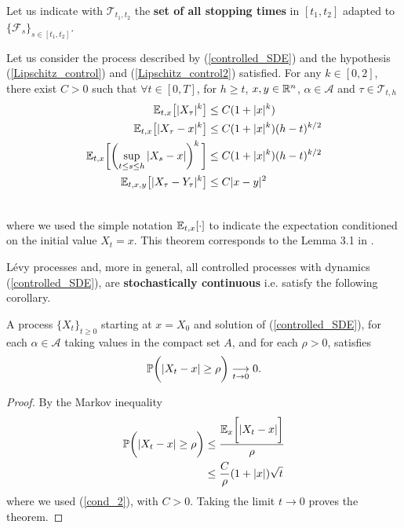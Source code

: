 \begin{Definition}
 Let us indicate with $\mathcal{T}_{t_1,t_2}$ the \textbf{set of all stopping times} in $[t_1,t_2]$ adapted to $\{\mathcal{F}_s\}_{s\in [t_1,t_2]}$.
\end{Definition}
\begin{Theorem}
 Let us consider the process described by (\ref{controlled_SDE}) and the hypothesis (\ref{Lipschitz_control}) and (\ref{Lipschitz_control2}) satisfied. 
 For any $k \in [0,2]$, there exist $C>0$ such that $\forall t \in [0,T]$, for $h \geq t$, $x,y \in \mathbb{R}^n$, 
 $\alpha \in \mathcal{A}$ and $\tau \in \mathcal{T}_{t,h}$
 \begin{align}
  \mathbb{E}_{t,x}\bigl[ |X_{\tau}|^k \bigr] &\leq C (1+|x|^k) \\ \label{cond_2}
  \mathbb{E}_{t,x}\bigl[ |X_{\tau} - x|^k \bigr] &\leq C (1+|x|^k)(h-t)^{k/2} \\ \label{cond_3}
  \mathbb{E}_{t,x}\biggl[ \biggl( \sup_{t \leq s\leq h} |X_{s} - x| \biggr)^k \, \biggr] &\leq C (1+|x|^k)(h-t)^{k/2} \\ \label{cond_4} 
  \mathbb{E}_{t,x,y}\bigl[ |X_{\tau} - Y_{\tau}|^k \bigr] &\leq C |x-y|^2 \\ \nonumber
 \end{align}
\end{Theorem}
\noindent where we used the simple notation $\mathbb{E}_{t,x}[\cdot]$ to indicate the expectation conditioned on the initial value $X_t=x$.   
This theorem corresponds to the Lemma 3.1 in \cite{Ph98}.

Lévy processes and, more in general, all controlled processes with dynamics (\ref{controlled_SDE}), 
are \textbf{stochastically continuous} i.e. satisfy the following corollary.
\begin{Corollary}\label{stochastic_theorem}
 A process $\{X_t\}_{t\geq0}$ starting at $x=X_0$ and solution of (\ref{controlled_SDE}), for each $ \alpha \in \mathcal{A}$ taking values in the compact set $A$, 
 and for each $\rho>0$, satisfies
 \begin{equation}
   \mathbb{P} \biggl( | X_t - x | \geq \rho \biggr) \underset{t\to0}{\longrightarrow} 0.
 \end{equation}
\end{Corollary}
\begin{proof}
By the Markov inequality
 \begin{align*}
  \mathbb{P} \biggl( | X_t - x | \geq \rho \biggr) & \leq \frac{\mathbb{E}_{x}\biggl[ |X_t - x| \biggr]}{\rho} \\
   & \leq \frac{C}{\rho} (1+|x|)\sqrt{t}
 \end{align*}
 where we used (\ref{cond_2}), with $C>0$. Taking the limit $t\to 0$ proves the theorem.
\end{proof}


